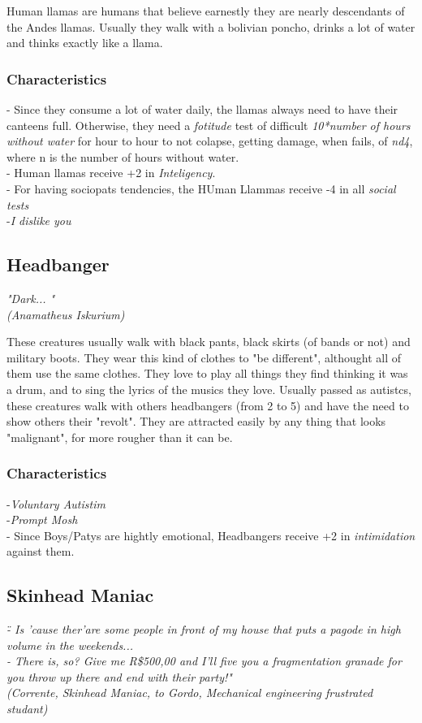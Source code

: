 \documentclass[ letterpaper,12pt]{article}
\begin{document}
Human llamas are humans that believe earnestly they are nearly descendants of the Andes llamas. Usually they walk with a bolivian poncho, drinks a lot of water and thinks exactly like a llama.

\subsubsection{Characteristics}
- Since they consume a lot of water daily, the llamas always need to have their canteens full. Otherwise, they need a {\it fotitude} test of difficult {\it 10*number of hours without water} for hour to hour to not colapse, getting damage, when fails, of {\it nd4}, where n is the number of hours without water.\\
- Human llamas receive +2 in {\it Inteligency}.\\
- For having sociopats tendencies, the HUman Llammas receive -4 in all {\it social tests}\\
-{\it I dislike you}\\

\subsection{Headbanger}
{\it "Dark... "\\
(Anamatheus Iskurium)\\}

These creatures usually walk with black pants, black skirts (of bands or not) and military boots. They wear this kind of clothes to "be different", althought all of them use the same clothes. They love to play all things they find thinking it was a drum, and to sing the lyrics of the musics they love. Usually passed as autistcs, these creatures walk with others headbangers (from 2 to 5) and have the need to show others their "revolt". They are attracted easily by any thing that looks "malignant", for more rougher than it can be.

\subsubsection{Characteristics}
-{\it Voluntary Autistim}\\
-{\it Prompt Mosh}\\
- Since Boys/Patys are hightly emotional, Headbangers receive +2 in {\it intimidation} against them.

\subsection{Skinhead Maniac}
{\it \" - Is 'cause ther'are some people in front of my house that puts a pagode in high volume in the weekends...\\
 - There is, so? Give me R\$500,00 and I'll five you a fragmentation granade for you throw up there and end with their party!"\\
(Corrente, Skinhead Maniac, to Gordo, Mechanical engineering frustrated studant)}\\
\end{document}
